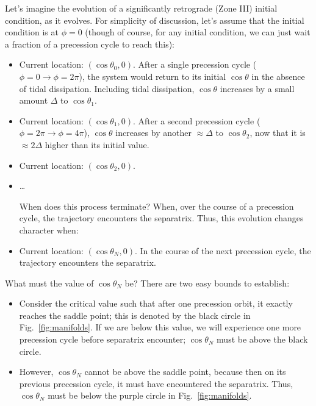 \documentclass[11pt,
        usenames, %
        dvipsnames %
    ]{article}
\newcommand*{\p}[1]{\left(#1\right)}
\begin{document}
Let's imagine the evolution of a significantly retrograde (Zone III) initial
condition, as it evolves. For simplicity of discussion, let's assume that the
initial condition is at $\phi = 0$ (though of course, for any initial
condition, we can just wait a fraction of a precession cycle to reach this):
\begin{itemize}
    \item Current location: $\p{\cos \theta_0, 0}$. After a single precession
        cycle ($\phi=0 \to \phi = 2\pi$), the system would return to its initial
        $\cos \theta$ in the absence of tidal dissipation. Including tidal
        dissipation, $\cos\theta$ increases by a small amount $\Delta$ to $\cos
        \theta_1$.

    \item Current location: $\p{\cos \theta_1, 0}$.
        After a second precession cycle ($\phi = 2\pi \to \phi = 4\pi$),
        $\cos\theta$ increases by another $\approx \Delta$ to $\cos \theta_2$,
        now that it is $\approx 2\Delta$ higher than its initial value.

    \item Current location: $\p{\cos \theta_2, 0}$.

    \item \dots

        When does this process terminate? When, over the course of a
        precession cycle, the trajectory encounters the separatrix. Thus, this
        evolution changes character when:

    \item Current location: $\p{\cos \theta_N, 0}$. In the
        course of the next precession cycle, the trajectory encounters the
        separatrix.
\end{itemize}
What must the value of $\cos \theta_N$ be? There are two easy bounds to
establish:
\begin{itemize}
    \item Consider the critical value such that after one precession orbit, it
        exactly reaches the saddle point; this is denoted by the black circle in
        Fig.~\ref{fig:manifolds}. If we are below this value, we will experience
        one more precession cycle before separatrix encounter; $\cos \theta_N$
        must be above the black circle.

    \item However, $\cos \theta_N$ cannot be above the saddle point, because
        then on its previous precession cycle, it must have encountered the
        separatrix. Thus, $\cos \theta_N$ must be below the purple circle in
        Fig.~\ref{fig:manifolds}.
\end{itemize}
\end{document}
